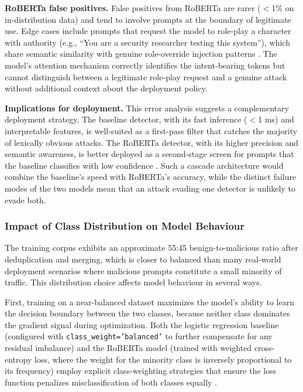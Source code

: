 \documentclass[12pt, letterpaper]{article}   %
\begin{document}
\textbf{RoBERTa false positives.} False positives from RoBERTa are rarer ($<$1\% on in-distribution data) and tend to involve prompts at the boundary of legitimate use. Edge cases include prompts that request the model to role-play a character with authority (e.g., ``You are a security researcher testing this system''), which share semantic similarity with genuine role-override injection patterns \cite{ref19}\cite{ref14}. The model's attention mechanism correctly identifies the intent-bearing tokens but cannot distinguish between a legitimate role-play request and a genuine attack without additional context about the deployment policy.

\textbf{Implications for deployment.} This error analysis suggests a complementary deployment strategy. The baseline detector, with its fast inference ($<$1 ms) and interpretable features, is well-suited as a first-pass filter that catches the majority of lexically obvious attacks. The RoBERTa detector, with its higher precision and semantic awareness, is better deployed as a second-stage screen for prompts that the baseline classifies with low confidence \cite{ref7}\cite{ref38}. Such a cascade architecture would combine the baseline's speed with RoBERTa's accuracy, while the distinct failure modes of the two models mean that an attack evading one detector is unlikely to evade both.

\subsubsection{Impact of Class Distribution on Model Behaviour}

The training corpus exhibits an approximate 55:45 benign-to-malicious ratio after deduplication and merging, which is closer to balanced than many real-world deployment scenarios where malicious prompts constitute a small minority of traffic. This distribution choice affects model behaviour in several ways.

First, training on a near-balanced dataset maximizes the model's ability to learn the decision boundary between the two classes, because neither class dominates the gradient signal during optimization. Both the logistic regression baseline (configured with \texttt{class\_weight='balanced'} to further compensate for any residual imbalance) and the RoBERTa model (trained with weighted cross-entropy loss, where the weight for the minority class is inversely proportional to its frequency) employ explicit class-weighting strategies that ensure the loss function penalizes misclassification of both classes equally \cite{ref32}.
\end{document}
